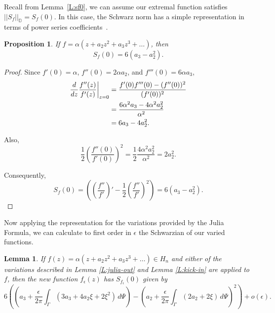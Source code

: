 \documentclass{lms}
\newcommand{\D}{\mathbb D}
\newcommand{\norm}[1]{\lvert\lvert#1\rvert\rvert}
\newcommand{\e}{\epsilon}
\newtheorem{lemma}[theorem]{Lemma}
\newtheorem{proposition}[theorem]{Proposition}
\numberwithin{equation}{section}
\begin{document}
Recall from Lemma~\ref{L:sf0}, we can assume our extremal function
satisfies $\norm{S_f}_\D = S_f(0)$.
In this case, the Schwarz norm has a simple representation 
in terms of power series coefficients~\cite{oL87,PM00}.

\begin{proposition}\label{P:Sf0}
If $f=\alpha(z + a_2 z^2 + a_3 z^3 +\dots)$, 
then
\[
S_f(0)=6(a_3 - a_2^2).
\]
\end{proposition}

\begin{proof}

Since $f'(0)=\alpha$, $f''(0)={2}\alpha a_2$, and 
$f'''(0)={6}\alpha a_3$,
\begin{align}\notag
\frac{d}{dz} \frac{f''(z)}{f'(z)}\bigg\vert_{z=0}
&=\frac{f'(0)f'''(0)- (f''(0))^2}{(f'(0))^2}\\\notag
&=\frac{6\alpha^2 a_3 - {4}\alpha^2 a_2^2}{\alpha^2}\\\notag
&=6a_3 -4 a_2^2.
\end{align}

Also,
\[
\frac{1}{2}\left(\frac{f''(0)}{f'(0)}\right)^2 
=\frac{1}{2}\frac{4 \alpha^2 a_2^2}{\alpha^2}
= 2 a_2^2.
\]

Consequently,
\[
S_f(0)= %
\left(
\left(\frac{f''}{f'} \right)' - \frac12 \left( \frac{f''}{f'}
\right)^2\right) = 6(a_3-a_2^2).
\]

\end{proof}

Now applying the representation for the variations provided by the
Julia Formula, we can calculate to first order in $\epsilon$ the
Schwarzian of our varied functions.

\begin{lemma}\label{L:Sg}
If $f(z)=\alpha(z +a_2 z^2 +a_3 z^3 + \dots)\in H_n$ 
and either of the variations described in Lemma \ref{L:julia-out} and Lemma \ref{L:kick-in} 
are applied to $f$, then
the new function $f_\epsilon(z)$ has $S_{f_\epsilon}(0)$ given by
\[
6\left( \left( a_3 +\frac{\epsilon}{2\pi} \int_\Gamma
(3a_3 + 4a_2\xi + 2\xi^2) \, d\Psi \right) -
\left( a_2 +\frac{\e}{2\pi} \int_\Gamma (2a_2 + 2\xi) \, d\Psi \right)^2\right)
+o(\epsilon).
\]
\end{lemma}
\end{document}
